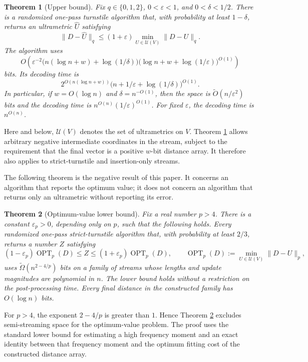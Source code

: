 \documentclass[11pt]{article}
\newtheorem{theorem}{Theorem}[section]
\theoremstyle{definition}
\newcommand{\cU}{\mathcal{U}}
\newcommand{\OPT}{\operatorname{OPT}}
\begin{document}
\begin{theorem}[Upper bound]\label{thm:upper-intro}
Fix \(q\in\{0,1,2\}\), \(0<\varepsilon<1\), and \(0<\delta<1/2\).
There is a randomized one-pass turnstile algorithm that, with probability at
least \(1-\delta\), returns an ultrametric \(\widehat U\) satisfying
\[
  \lVert D-\widehat U\rVert_q
  \le (1+\varepsilon)\min_{U\in\cU(V)}\lVert D-U\rVert_q.
\]
The algorithm uses
\[
 O\!\left(
   \varepsilon^{-2}
   \bigl(n(\log n+w)+\log(1/\delta)\bigr)
   \bigl(\log n+w+\log(1/\varepsilon)\bigr)^{O(1)}
 \right)
\]
bits.  Its decoding time is
\[
 2^{O(n(\log n+w))}
 \bigl(n+1/\varepsilon+\log(1/\delta)\bigr)^{O(1)}.
\]
In particular, if \(w=O(\log n)\) and
\(\delta=n^{-O(1)}\), then the space is
\(\widetilde O(n/\varepsilon^2)\) bits and the decoding time is
\(n^{O(n)}(1/\varepsilon)^{O(1)}\).  For fixed \(\varepsilon\), the decoding
time is \(n^{O(n)}\).
\end{theorem}

Here and below, \(\cU(V)\) denotes the set of ultrametrics on \(V\).  Theorem
\ref{thm:upper-intro} allows arbitrary negative intermediate coordinates in
the stream, subject to the requirement that the final vector is a positive
\(w\)-bit distance array.  It therefore also applies to strict-turnstile and
insertion-only streams.

The following theorem is the negative result of this paper.  It concerns an
algorithm that reports the optimum value; it does not concern an algorithm
that returns only an ultrametric without reporting its error.

\begin{theorem}[Optimum-value lower bound]\label{thm:lower-intro}
Fix a real number \(p>4\).  There is a constant
\(\varepsilon_p>0\), depending only on \(p\), such that the following holds.
Every randomized one-pass strict-turnstile algorithm that, with probability at
least \(2/3\), returns a number \(Z\) satisfying
\[
 (1-\varepsilon_p)\OPT_p(D)
 \le Z\le
 (1+\varepsilon_p)\OPT_p(D),
 \qquad
 \OPT_p(D):=\min_{U\in\cU(V)}\lVert D-U\rVert_p,
\]
uses \(\widetilde\Omega(n^{2-4/p})\) bits on a family of streams whose
lengths and update magnitudes are polynomial in \(n\).  The lower bound holds
without a restriction on the post-processing time.  Every final distance in
the constructed family has \(O(\log n)\) bits.
\end{theorem}

For \(p>4\), the exponent \(2-4/p\) is greater than \(1\).  Hence Theorem
\ref{thm:lower-intro} excludes semi-streaming space for the optimum-value
problem.  The proof uses the standard lower bound for estimating a high
frequency moment and an exact identity between that frequency moment and the
optimum fitting cost of the constructed distance array.
\end{document}
